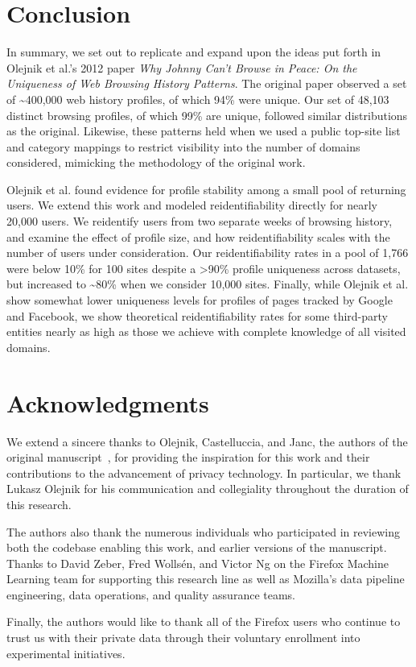 \documentclass[letterpaper,twocolumn,10pt]{article}
\begin{document}
\section{Conclusion}
\label{sec:conclusions}
In summary, we set out to replicate and expand upon the ideas put forth in Olejnik et al.'s 2012 paper \textit{Why Johnny Can't Browse in Peace: On the Uniqueness of Web Browsing History Patterns}. 
The original paper observed a set of \textasciitilde{}400,000 web history profiles, of which 94\% were unique. 
Our set of 48,103 distinct browsing profiles, of which 99\% are unique, followed similar distributions as the original.
Likewise, these patterns held when we used a public top-site list and category mappings to restrict visibility into the number of domains considered, mimicking the methodology of the original work. 

Olejnik et al. found evidence for profile stability among a small pool of returning users.
We extend this work and modeled reidentifiability directly for nearly 20,000 users. We reidentify users from two separate weeks of browsing history, and examine the effect of profile size, and how reidentifiability scales with the number of users under consideration.
Our reidentifiability rates in a pool of 1,766 were below 10\% for 100 sites despite a >90\% profile uniqueness across datasets, but increased to \textasciitilde{80\%} when we consider 10,000 sites. 
Finally, while Olejnik et al. show somewhat lower uniqueness levels for profiles of pages tracked by Google and Facebook, we show theoretical reidentifiability rates for some third-party entities nearly as high as those we achieve with complete knowledge of all visited domains. 
%
\section*{Acknowledgments}
We extend a sincere thanks to Olejnik, Castelluccia, and Janc, the authors of the original manuscript~\cite{olejnikWhyJohnnyCan2012}, for providing the inspiration for this work and their contributions to the advancement of privacy technology. In particular, we thank Lukasz Olejnik for his communication and collegiality throughout the duration of this research.

The authors also thank the numerous individuals who participated in reviewing both the codebase enabling this work, and earlier versions of the manuscript. Thanks to David Zeber, Fred Wolls\'{e}n, and Victor Ng on the Firefox Machine Learning team for supporting this research line as well as Mozilla's data pipeline engineering, data operations, and quality assurance teams.

Finally, the authors would like to thank all of the Firefox users who continue to trust us with their private data through their voluntary enrollment into experimental initiatives.


\end{document}
